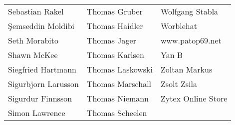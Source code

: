 \begin{small}
\begin{tabular}{p{4cm}p{4cm}p{4cm}}
Sebastian Rakel & Thomas Gruber & Wolfgang Stabla \\
Şemseddin Moldibi & Thomas Haidler & Worblehat \\
Seth Morabito & Thomas Jager & www.patop69.net \\
Shawn McKee & Thomas Karlsen & Yan B \\
Siegfried Hartmann & Thomas Laskowski & Zoltan Markus \\
Sigurbjorn Larusson & Thomas Marschall & Zsolt Zsila \\
Sigurdur Finnsson & Thomas Niemann & Zytex Online Store \\
Simon Lawrence & Thomas Scheelen &  \\
\end{tabular}
\end{small}
